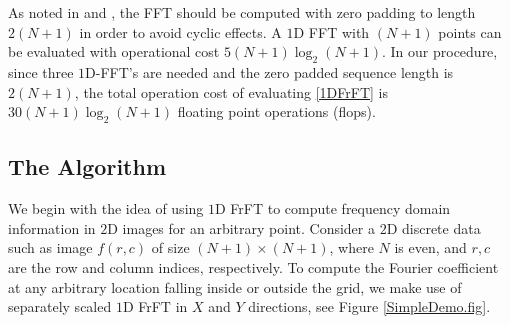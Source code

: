 \documentclass{UCF_ETD}
\begin{document}
 As noted in \cite{Bailey1991} and \cite{Amir2006}, the FFT should be computed with zero padding to length $2(N+1)$ in order to avoid cyclic effects. A  $1$D FFT with $(N+1)$ points can be evaluated with operational cost $5 (N+1)\log_2(N+1)$.
 In our procedure, since three $1$D-FFT's are needed and  the zero padded sequence length is $2(N+1)$, the total operation cost of evaluating \eqref{1DFrFT}  is $30(N+1)\log_2(N+1)$ floating point operations (flops).
 
 \subsection{The Algorithm}
 We begin with the idea of using $1$D FrFT to compute frequency domain information in $2$D images for an arbitrary point. Consider a $2$D discrete data such as image $f (r,c)$ of size $(N+1) \times (N+1)$, where $N$ is even, and $r, c$ are the row and column indices, respectively. To compute the Fourier coefficient at any arbitrary %
 location falling inside or outside the grid, we  make use of separately scaled $1$D FrFT in $X$ and $Y$ directions, see  Figure \ref{SimpleDemo.fig}.
\end{document}
